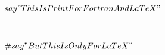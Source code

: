 \documentclass[12pt]{article}
\begin{document}
 
\begin{equation} 
\begin{aligned} 
&  \\ 
 & say "This Is Print For Fortran And LaTeX" \\ 
 &  \\ 
 &  \\ 
 & \# say "But This Is Only For LaTeX" \\ 
 &  \\ 
 &  \\ 
 & 
\end{aligned} 
\end{equation} 
\end{document}
